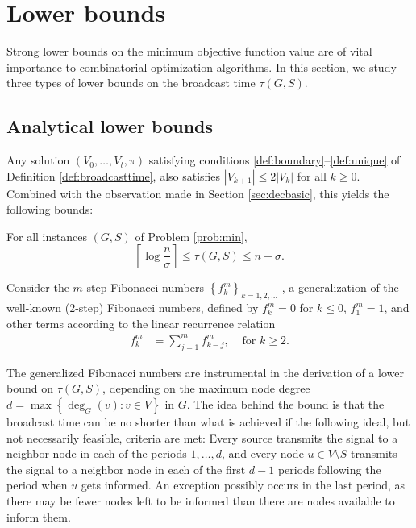 \section{Lower bounds} \label{sec:lb}
Strong lower bounds on the minimum objective function value are of vital importance to combinatorial optimization algorithms.
In this section, we study three types of lower bounds on the broadcast time $\tau(G,S)$.

\subsection{Analytical lower bounds} \label{sec:lbanalyt}
Any solution $\left(V_0,\ldots,V_t,\pi\right)$ satisfying conditions \ref{def:boundary}--\ref{def:unique} of Definition \ref{def:broadcasttime},
also satisfies $\left|V_{k+1}\right|\leq 2\left|V_k\right|$ for all $k\geq 0$.
Combined with the observation made in Section \ref{sec:decbasic}, this yields the following bounds:
\begin{observation}
For all instances $(G,S)$ of Problem \ref{prob:min},
\begin{equation}
\left\lceil\log\frac{n}{\sigma}\right\rceil\leq \tau(G,S) \leq n-\sigma.
\label{eq:loglb}
\end{equation}
\label{obs:loglb}
\end{observation}

Consider the $m$-step Fibonacci numbers $\left\{f^{m}_k\right\}_{k=1,2,\ldots}$ \cite{noe05}, a generalization of the well-known (2-step) Fibonacci numbers, defined by
$f^{m}_k=0$ for $k\leq 0$, $f^{m}_1=1$, and 
other terms according to the linear recurrence relation 
\begin{align*}
f^{m}_k &=\sum\limits_{j=1}^m f^{m}_{k-j}, &\text{ for } k\geq 2.
\end{align*}

The generalized Fibonacci numbers are instrumental in the derivation of a lower bound on $\tau(G,S)$,
depending on the maximum node degree $d=\max\left\{\deg_G(v): v\in V\right\}$ in $G$.
The idea behind the bound is that the broadcast time can be no shorter than what is achieved if
the following ideal, but not necessarily feasible, criteria are met:
Every source transmits the signal to a neighbor node in each of the periods $1,\ldots,d$,
and every node $u\in V\setminus S$
transmits the signal to a neighbor node in each of the first $d-1$ periods following the period when $u$ gets informed.
An exception possibly occurs in the last period, as there may be fewer nodes left to be informed than there are nodes available to inform them.

